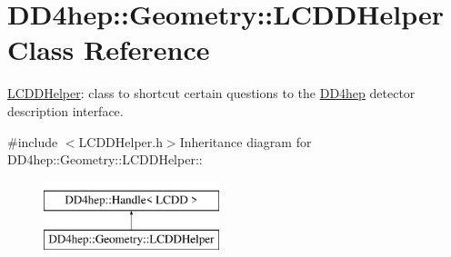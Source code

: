 \hypertarget{class_d_d4hep_1_1_geometry_1_1_l_c_d_d_helper}{
\section{DD4hep::Geometry::LCDDHelper Class Reference}
\label{class_d_d4hep_1_1_geometry_1_1_l_c_d_d_helper}
}


\hyperlink{class_d_d4hep_1_1_geometry_1_1_l_c_d_d_helper}{LCDDHelper}: class to shortcut certain questions to the \hyperlink{namespace_d_d4hep}{DD4hep} detector description interface.  


{\ttfamily \#include $<$LCDDHelper.h$>$}Inheritance diagram for DD4hep::Geometry::LCDDHelper::\begin{figure}[H]
\begin{center}
\leavevmode
\includegraphics[height=2cm]{class_d_d4hep_1_1_geometry_1_1_l_c_d_d_helper}
\end{center}
\end{figure}
